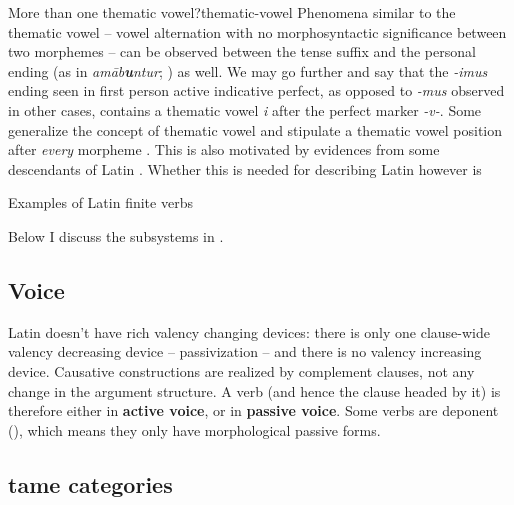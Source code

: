 \documentclass[a4paper, oneside, 12pt]{report}
\newcommand*{\concept}[1]{\textbf{#1}}
\newcommand{\form}[1]{\emph{#1}}
\begin{document}
\begin{infobox}{More than one thematic vowel?}{thematic-vowel}
    Phenomena similar to the thematic vowel -- vowel alternation with no morphosyntactic significance 
    between two morphemes -- can be observed 
    between the tense suffix and the personal ending 
    (as in \form{am\={a}b\textbf{u}ntur}; ) as well.
    We may go further and say that
    the \form{-imus} ending seen in first person active indicative perfect,
    as opposed to \form{-mus} observed in other cases, 
    contains a thematic vowel \form{i} after the perfect marker \form{-v-}.
    Some generalize the concept of thematic vowel and 
    stipulate a thematic vowel position after \emph{every} morpheme
    \cite{embick2003latin}.
    This is also motivated by evidences from some descendants of Latin 
    \citep{oltra1999notion,oltra2005stress}.
    Whether this is needed for describing Latin however is 
\end{infobox}

\begin{sidewaystable}
    \centering
    \caption{Examples of Latin finite verbs}
    \label{tbl:latin-finite-verbs}
        
\end{sidewaystable}

Below I discuss the subsystems in .

\subsection{Voice}

Latin doesn't have rich valency changing devices:
there is only one clause-wide valency decreasing device -- passivization -- 
and there is no valency increasing device.
Causative constructions are realized by complement clauses,
not any change in the argument structure.
A verb (and hence the clause headed by it) is therefore either in \concept{active voice},
or in \concept{passive voice}.
Some verbs are deponent (),
which means they only have morphological passive forms.

\subsection{\acs{tame} categories}\label{sec:verb-inflection.finite-template.tame}
\end{document}
